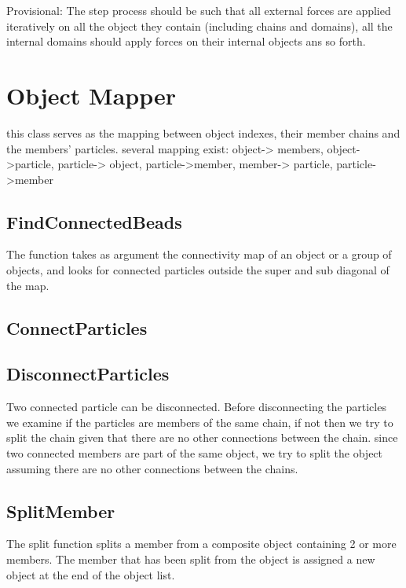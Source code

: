 \documentclass[12pt]{report}
\begin{document}
Provisional: The step process should be such that all external forces are applied iteratively on all the object they contain (including chains and domains), all the internal domains should apply forces on their internal objects ans so forth. 

\section{Object Mapper}
this class serves as the mapping between object indexes, their member chains and the members' particles. 
several mapping exist: object-> members, object->particle, particle-> object,  particle->member, member-> particle, particle->member

\subsection{FindConnectedBeads}
The function takes as argument the connectivity map of an object or a group of objects, and looks for connected particles outside the super and sub diagonal of the map. 

\subsection{ConnectParticles}


\subsection{DisconnectParticles}
Two connected particle can be disconnected. Before disconnecting the particles we examine if the particles are members of the same chain, if not then we try to split the chain given that there are no other connections between the chain.
since two connected members are part of the same object, we try to split the object assuming there are no other connections between the chains.

\subsection{SplitMember}
The split function splits a member from a composite object containing 2 or more members. The member that has been split from the object is assigned a new object at the end of the object list.  
\end{document}
